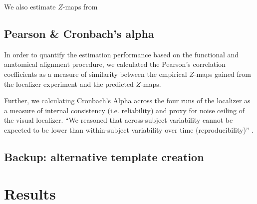 We also estimate $Z$-maps from \citet{haeusler2022processing}


\subsection{Pearson \& Cronbach's alpha}
In order to quantify the estimation performance based on the functional and
anatomical alignment procedure, we calculated the Pearson's correlation
coefficients as a measure of similarity between the empirical $Z$-maps gained
from the localizer experiment and the predicted $Z$-maps.

Further, we calculating Cronbach's Alpha across the four runs of the localizer
as a measure of internal consistency (i.e.  reliability) and proxy for noise
ceiling of the visual localizer.
%
``We reasoned that across-subject variability cannot be expected to be lower
than within-subject variability over time (reproducibility)''
\citep{rosenke2021probabilistic}.


\subsection{Backup: alternative template creation}








\section{Results}



